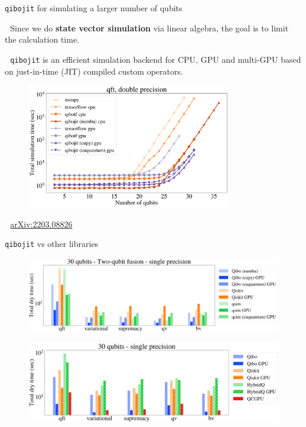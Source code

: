 \documentclass[8pt, xcolor={svgnames}, hyperref={colorlinks,linkcolor=black, citecolor=amethyst, urlcolor=amethyst}]{beamer}
\begin{document}
\begin{frame}{\texttt{qibojit} for simulating a larger number of qubits}
\large 

\faArrowCircleRight\,\, Since we do \textbf{state vector simulation} via linear 
algebra, the goal is to limit the calculation time.

\faArrowCircleRight\,\, \texttt{qibojit} is an efficient simulation backend for 
CPU, GPU and multi-GPU based on just-in-time (JIT) compiled custom operators. 

    \begin{figure}
    \centering 
    \includegraphics[width=0.8\textwidth]{figures/qibojit-qft.png}
  \end{figure}
  
  \faBook\,\, \href{https://arxiv.org/abs/2203.08826}{arXiv:2203.08826}
\end{frame}

\begin{frame}{\texttt{qibojit} vs other libraries}
\large 

\begin{figure}
    \centering 
    \includegraphics[width=1\textwidth]{figures/libraries.png}
\end{figure}

\begin{figure}
    \centering 
    \includegraphics[width=1\textwidth]{figures/lib-2.png}
  \end{figure}
    
\end{frame}
\end{document}

